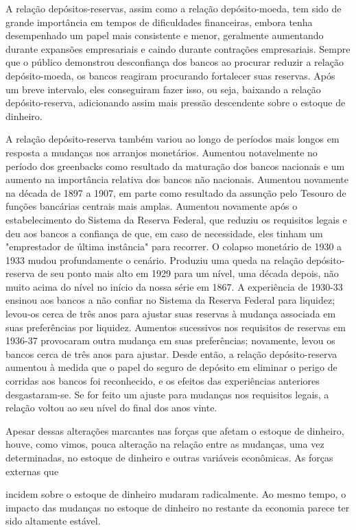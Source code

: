 \documentclass[a4paper,12pt]{article}[abntex2]
\begin{document}
A relação depósitos-reservas, assim como a relação depósito-moeda, tem sido de grande importância em tempos de dificuldades financeiras, embora tenha desempenhado um papel mais consistente e menor, geralmente aumentando durante expansões empresariais e caindo durante contrações empresariais. Sempre que o público demonstrou desconfiança dos bancos ao procurar reduzir a relação depósito-moeda, os bancos reagiram procurando fortalecer suas reservas. Após um breve intervalo, eles conseguiram fazer isso, ou seja, baixando a relação depósito-reserva, adicionando assim mais pressão descendente sobre o estoque de dinheiro.

A relação depósito-reserva também variou ao longo de períodos mais longos em resposta a mudanças nos arranjos monetários. Aumentou notavelmente no período dos greenbacks como resultado da maturação dos bancos nacionais e um aumento na importância relativa dos bancos não nacionais. Aumentou novamente na década de 1897 a 1907, em parte como resultado da assunção pelo Tesouro de funções bancárias centrais mais amplas. Aumentou novamente após o estabelecimento do Sistema da Reserva Federal, que reduziu os requisitos legais e deu aos bancos a confiança de que, em caso de necessidade, eles tinham um "emprestador de última instância" para recorrer. O colapso monetário de 1930 a 1933 mudou profundamente o cenário. Produziu uma queda na relação depósito-reserva de seu ponto mais alto em 1929 para um nível, uma década depois, não muito acima do nível no início da nossa série em 1867. A experiência de 1930-33 ensinou aos bancos a não confiar no Sistema da Reserva Federal para liquidez; levou-os cerca de três anos para ajustar suas reservas à mudança associada em suas preferências por liquidez. Aumentos sucessivos nos requisitos de reservas em 1936-37 provocaram outra mudança em suas preferências; novamente, levou os bancos cerca de três anos para ajustar. Desde então, a relação depósito-reserva aumentou à medida que o papel do seguro de depósito em eliminar o perigo de corridas aos bancos foi reconhecido, e os efeitos das experiências anteriores desgastaram-se. Se for feito um ajuste para mudanças nos requisitos legais, a relação voltou ao seu nível do final dos anos vinte.

Apesar dessas alterações marcantes nas forças que afetam o estoque de dinheiro, houve, como vimos, pouca alteração na relação entre as mudanças, uma vez determinadas, no estoque de dinheiro e outras variáveis econômicas. As forças externas que

 incidem sobre o estoque de dinheiro mudaram radicalmente. Ao mesmo tempo, o impacto das mudanças no estoque de dinheiro no restante da economia parece ter sido altamente estável.
\end{document}
